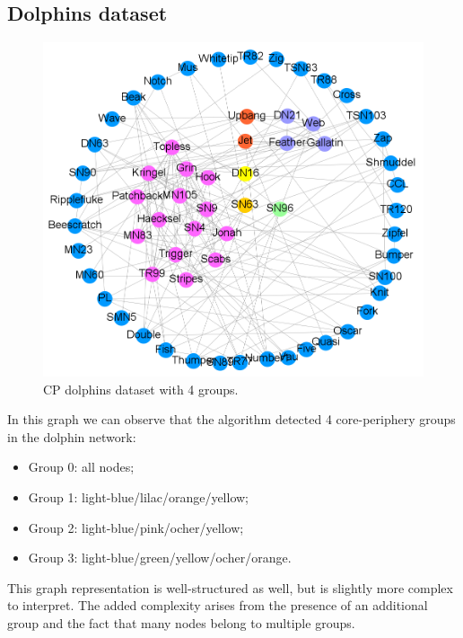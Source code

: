 \documentclass[sigconf]{acmart}
\begin{document}
\subsection{Dolphins dataset}
\FloatBarrier
\begin{figure}[h]
    \centering
    \includegraphics[width=1.05\linewidth]{Img/dolphins 4 groups.png}
    \caption{CP dolphins dataset with 4 groups.}
    \label{fig:general cp}
\end{figure}
\FloatBarrier
\noindent In this graph we can observe that the algorithm detected 4 core-periphery groups in the dolphin network:
\begin{itemize}
    \item Group 0: all nodes;
    \item Group 1: light-blue/lilac/orange/yellow;
    \item Group 2: light-blue/pink/ocher/yellow;
    \item Group 3: light-blue/green/yellow/ocher/orange.
\end{itemize}
This graph representation is well-structured as well, but is slightly more complex to interpret. The added complexity arises from the presence of an additional group and the fact that many nodes belong to multiple groups.
\end{document}
